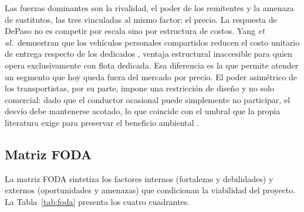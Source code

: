 {Las fuerzas dominantes son la rivalidad, el poder de los remitentes y la amenaza de sustitutos, las tres vinculadas al mismo factor: el precio. La respuesta de DePaso no es competir por escala sino por estructura de costos. Yang \textit{et al.}\ demuestran que los vehículos personales compartidos reducen el costo unitario de entrega respecto de los dedicados \parencite{YangEtAl2022}, ventaja estructural inaccesible para quien opera exclusivamente con flota dedicada. Esa diferencia es la que permite atender un segmento que hoy queda fuera del mercado por precio. El poder asimétrico de los transportistas, por su parte, impone una restricción de diseño y no solo comercial: dado que el conductor ocasional puede simplemente no participar, el desvío debe mantenerse acotado, lo que coincide con el umbral que la propia literatura exige para preservar el beneficio ambiental \parencite{YangEtAl2022}.

\subsection{Matriz FODA}

La matriz FODA sintetiza los factores internos (fortalezas y debilidades) y externos (oportunidades y amenazas) que condicionan la viabilidad del proyecto. La Tabla~\ref{tab:foda} presenta los cuatro cuadrantes.

}
